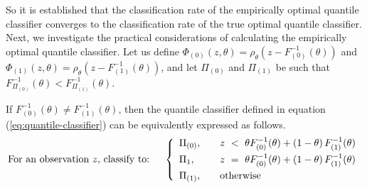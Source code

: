 So it is established that the classification rate of the empirically optimal
quantile classifier converges to the classification rate of the true optimal
quantile classifier.  Next, we investigate the practical considerations of
calculating the empirically optimal quantile classifier.  Let us define
$\Phi_{(0)}(z, \theta) = \rho_{\theta}\left(z - F_{(0)}^{-1}(\theta)\right)$ and
$\Phi_{(1)}(z, \theta) = \rho_{\theta}\left(z - F_{(1)}^{-1}(\theta)\right)$,
and let $\Pi_{(0)}$ and $\Pi_{(1)}$ be such that
$F_{\Pi_{(0)}}^{-1}(\theta) < F_{\Pi_{(1)}}^{-1}(\theta)$.

\begin{lemma}
  \label{lem:decision-boundary}
  If $F_{(0)}^{-1}(\theta) \ne F_{(1)}^{-1}(\theta)$, then the quantile
  classifier defined in equation (\ref{eq:quantile-classifier}) can be
  equivalently expressed as follows.
  \begin{equation}
    \label{eq:alt-quantile-classifier}
    \text{For an observation $z$, classify to:} \hspace{5mm} \left\{ 
      \begin{array}{lcl}
        \Pi_{(0)}, & & z ~<~ \theta F_{(0)}^{-1}(\theta) +
                       (1 - \theta)\, F_{(1)}^{-1}(\theta) \\[1ex]
        \Pi_{1}, & & z ~=~ \theta F_{(0)}^{-1}(\theta) +
                       (1 - \theta)\, F_{(1)}^{-1}(\theta) \\[1ex]
        \Pi_{(1)}, & & \textup{otherwise}
      \end{array}
    \right.
  \end{equation}
\end{lemma}

